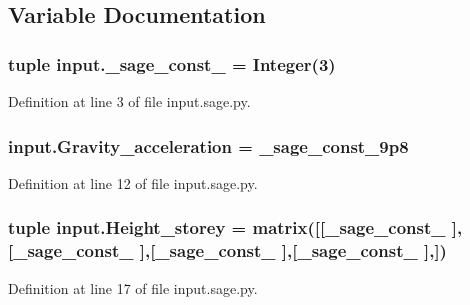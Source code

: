 \subsection{Variable Documentation}
\hypertarget{namespaceinput_a807fd6f7029374e2d9e918088f60bb88}{}
\subsubsection[{\+\_\+sage\+\_\+const\+\_\+3}]{\setlength{\rightskip}{0pt plus 5cm}tuple input.\+\_\+sage\+\_\+const\+\_ = Integer(3)}\label{namespaceinput_a807fd6f7029374e2d9e918088f60bb88}


Definition at line 3 of file input.\+sage.\+py.

\hypertarget{namespaceinput_a55ab15c1c171513e99332aa50c723764}{}
\subsubsection[{Gravity\+\_\+acceleration}]{\setlength{\rightskip}{0pt plus 5cm}input.\+Gravity\+\_\+acceleration = \+\_\+sage\+\_\+const\+\_\+9p8}\label{namespaceinput_a55ab15c1c171513e99332aa50c723764}


Definition at line 12 of file input.\+sage.\+py.

\hypertarget{namespaceinput_a01ad5b8730285b6aaebb2bc3f3fc0894}{}
\subsubsection[{Height\+\_\+storey}]{\setlength{\rightskip}{0pt plus 5cm}tuple input.\+Height\+\_\+storey = matrix(\mbox{[}\mbox{[}\+\_\+sage\+\_\+const\+\_ \mbox{]},\mbox{[}\+\_\+sage\+\_\+const\+\_ \mbox{]},\mbox{[}\+\_\+sage\+\_\+const\+\_ \mbox{]},\mbox{[}\+\_\+sage\+\_\+const\+\_ \mbox{]},\mbox{]})}\label{namespaceinput_a01ad5b8730285b6aaebb2bc3f3fc0894}


Definition at line 17 of file input.\+sage.\+py.

\hypertarget{namespaceinput_a0840d963ea24db338f3ab4457defb494}{}

